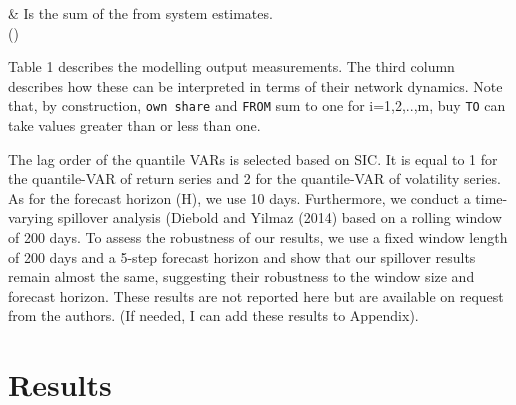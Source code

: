 \documentclass[
  number]{elsarticle}
\begin{document}
\begin{longtable}[]
                                                                                                                                                                                                                                                                                                                                                                                                                                                                                                                                                                                                                                                                                                                                                                                                                                                                                                                                                                                                                                                                                                              \)
& Is the sum of the from system estimates. \\
\bottomrule()
\end{longtable}

Table 1 describes the modelling output measurements. The third column
describes how these can be interpreted in terms of their network
dynamics. Note that, by construction, \texttt{own\ share} and
\texttt{FROM} sum to one for i=1,2,..,m, buy \texttt{TO} can take values
greater than or less than one.

The lag order of the quantile VARs is selected based on SIC. It is equal
to 1 for the quantile-VAR of return series and 2 for the quantile-VAR of
volatility series. As for the forecast horizon (H), we use 10 days.
Furthermore, we conduct a time-varying spillover analysis (Diebold and
Yilmaz (2014) based on a rolling window of 200 days. To assess the
robustness of our results, we use a fixed window length of 200 days and
a 5-step forecast horizon and show that our spillover results remain
almost the same, suggesting their robustness to the window size and
forecast horizon. These results are not reported here but are available
on request from the authors. (If needed, I can add these results to
Appendix).

\hypertarget{results}{%
\section{Results}\label{results}}
\end{document}
